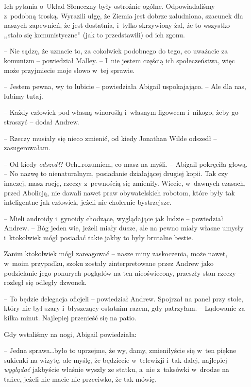 \documentclass[oneside,polish,11pt,sfheadings]{mwbk}
\begin{document}
Ich pytania o~Układ Słoneczny były ostrożnie ogólne. Odpowiadaliśmy z~podobną troską. Wyrazili ulgę, że Ziemia jest dobrze zaludniona,
szacunek dla naszych zapewnień, że jest dostatnia, i~tylko skrzywiony
żal, że to wszystko ,,stało się komunistyczne'' (jak to przedstawili) od
ich zgonu.

-- Nie sądzę, że uznacie to, za cokolwiek podobnego do tego, co uważacie
za komunizm -- powiedział Malley. -- I~nie jestem częścią ich
społeczeństwa, więc może przyjmiecie moje słowo w~tej sprawie.

-- Jestem pewna, wy to lubicie -- powiedziała Abigail uspokajająco. -- Ale
dla nas, lubimy tutaj.

-- Każdy człowiek pod własną winoroślą i~własnym figowcem i~nikogo, żeby
go straszyć -- dodał Andrew.

-- Rzeczy musiały się nieco zmienić, od kiedy Jonathan Wilde odszedł -- zasugerowałam.

-- Od kiedy \textit{odszedł}? Och\ldots  rozumiem, co masz na myśli. -- Abigail
pokręciła głową. -- No nazwę to nienaturalnym, posiadanie działającej
drugiej kopii. Tak czy inaczej, masz rację, rzeczy z~pewnością się
zmieniły. Wiecie, w~dawnych czasach, przed Abolicją, nie dawali nawet
praw obywatelskich robotom, które były tak inteligentne jak człowiek,
jeżeli nie cholernie bystrzejsze.

-- Mieli androidy i~gynoidy chodzące, wyglądające jak ludzie -- powiedział
Andrew. -- Bóg jeden wie, jeżeli miały dusze, ale na pewno miały własne
umysły i~ktokolwiek mógł posiadać takie jakby to były brutalne bestie.

Zanim ktokolwiek mógł zareagować -- nasze miny zaskoczenia, może nawet, w~moim przypadku, szoku zostały zinterpretowane przez Andrew jako
podzielanie jego ponurych poglądów na ten nieoświecony, przeszły stan
rzeczy -- rozległ się odległy dzwonek.

-- To będzie delegacja oficjeli -- powiedział Andrew. Spojrzał na panel
przy stole, który nie był szary i~błyszczący ostatnim razem, gdy
patrzyłam. -- Lądowanie za kilka minut. Najlepiej przenieść się na patio.

Gdy wstaliśmy na nogi, Abigail powiedziała: 

-- Jedna sprawa\ldots  było to
uprzejme, że wy, damy, zmieniłyście się w~ten piękne sukienki na wizytę,
ale myślę, że będziecie w~telewizji i~tak dalej, najlepiej
\textit{wyglądać} jakbyście właśnie wyszły ze statku, a~nie z~taksówki w~drodze na tańce, jeżeli nie macie nic przeciwko, że tak mówię.
\end{document}

